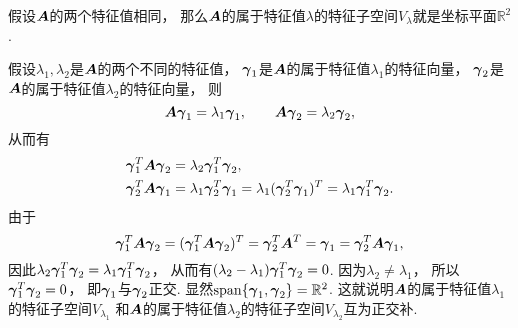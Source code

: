 假设\(\boldsymbol{A}\)的两个特征值相同，
那么\(\boldsymbol{A}\)的属于特征值\(\lambda\)的特征子空间\(V_\lambda\)就是坐标平面\(\mathbb{R}^2\).

假设\(\lambda_1,\lambda_2\)是\(\boldsymbol{A}\)的两个不同的特征值，
\(\boldsymbol\gamma_1\)是\(\boldsymbol{A}\)的属于特征值\(\lambda_1\)的特征向量，
\(\boldsymbol\gamma_2\)是\(\boldsymbol{A}\)的属于特征值\(\lambda_2\)的特征向量，
则\begin{equation*}
	\boldsymbol{A} \boldsymbol\gamma_1 = \lambda_1 \boldsymbol\gamma_1,
	\qquad
	\boldsymbol{A} \boldsymbol\gamma_2 = \lambda_2 \boldsymbol\gamma_2,
\end{equation*}
从而有\begin{align*}
	\boldsymbol\gamma_1^T \boldsymbol{A} \boldsymbol\gamma_2 &= \lambda_2 \boldsymbol\gamma_1^T \boldsymbol\gamma_2, \\
	\boldsymbol\gamma_2^T \boldsymbol{A} \boldsymbol\gamma_1 &= \lambda_1 \boldsymbol\gamma_2^T \boldsymbol\gamma_1
									= \lambda_1 (\boldsymbol\gamma_2^T \boldsymbol\gamma_1)^T
									= \lambda_1 \boldsymbol\gamma_1^T \boldsymbol\gamma_2.
\end{align*}
由于\begin{equation*}
	\boldsymbol\gamma_1^T \boldsymbol{A} \boldsymbol\gamma_2
	= (\boldsymbol\gamma_1^T \boldsymbol{A} \boldsymbol\gamma_2)^T
	= \boldsymbol\gamma_2^T \boldsymbol{A}^T = \boldsymbol\gamma_1
	= \boldsymbol\gamma_2^T \boldsymbol{A} \boldsymbol\gamma_1,
\end{equation*}
因此\(
	\lambda_2 \boldsymbol\gamma_1^T \boldsymbol\gamma_2
	= \lambda_1 \boldsymbol\gamma_1^T \boldsymbol\gamma_2
\)，
从而有\(
	(\lambda_2 - \lambda_1) \boldsymbol\gamma_1^T \boldsymbol\gamma_2 = 0
\).
因为\(\lambda_2 \neq \lambda_1\)，
所以\(\boldsymbol\gamma_1^T \boldsymbol\gamma_2 = 0\)，
即\(\boldsymbol\gamma_1\)与\(\boldsymbol\gamma_2\)正交.
显然\(\operatorname{span}\{\boldsymbol\gamma_1,\boldsymbol\gamma_2\} = \mathbb{R}^2\).
这就说明\(\boldsymbol{A}\)的属于特征值\(\lambda_1\)的特征子空间\(V_{\lambda_1}\)
和\(\boldsymbol{A}\)的属于特征值\(\lambda_2\)的特征子空间\(V_{\lambda_2}\)互为正交补.
